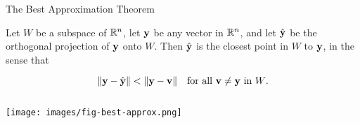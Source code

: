 \documentclass[xcolor=dvipsnames,aspectratio=169,t]{beamer}
\begin{document}
\begin{frame}{The Best Approximation Theorem}
  \begin{theorem}
  Let $W$ be a subspace of $\mathbb{R}^n$, let $\mathbf{y}$ be any vector in $\mathbb{R}^n$, and let $\hat{\mathbf{y}}$ be the orthogonal projection of $\mathbf{y}$ onto $W$.
  Then $\hat{\mathbf{y}}$ is the \alert{closest point} in $W$ to $\mathbf{y}$, in the sense that
  \vspace*{-.5em}
  
  \[ \| \mathbf{y} - \hat{\mathbf{y}} \| < \| \mathbf{y} - \mathbf{v} \| \quad \mbox{for all $\mathbf{v} \ne \mathbf{y}$ in $W$.}\] 
  \end{theorem}

  \begin{columns}[T]
  \column{0.5\tw}

  \medskip

  \column{0.5\tw}
  \vspace{-0.15in}
  
  \begin{center}
  \texttt{[image: images/fig-best-approx.png]}
  \end{center}
  \end{columns}
\end{frame}
\end{document}
